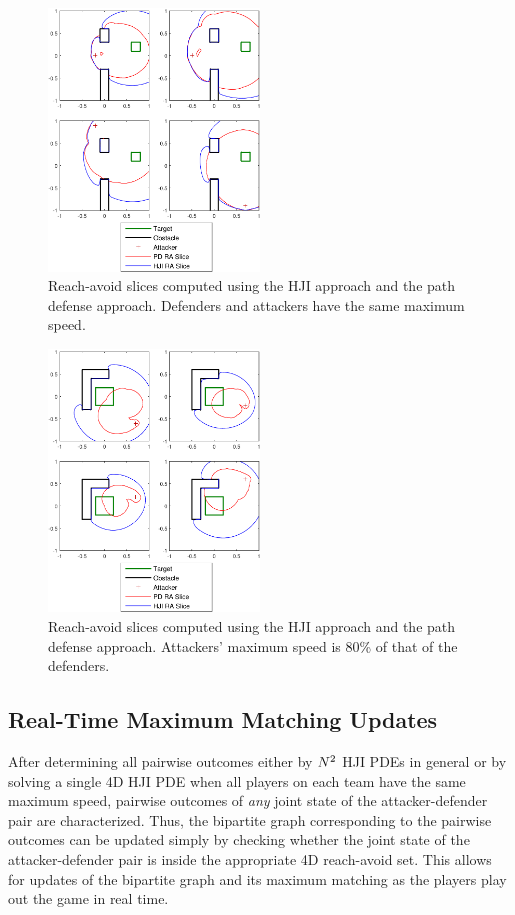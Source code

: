 \begin{figure}
	\centering
	\includegraphics[width=0.5\textwidth]{"fig/OLGame_compare"}
	\caption{Reach-avoid slices computed using the HJI approach and the path defense approach. Defenders and attackers have the same maximum speed.}
	\label{fig:comp_ol}
\end{figure}

\begin{figure}
	\centering
	\includegraphics[width=0.5\textwidth]{"fig/midLGame_compare"}
	\caption{Reach-avoid slices computed using the HJI approach and the path defense approach. Attackers' maximum speed is 80\% of that of the defenders.}
	\label{fig:comp_ml}
\end{figure}

\subsection{Real-Time Maximum Matching Updates}
After determining all pairwise outcomes either by $N^2$ HJI PDEs in general or by solving a single 4D HJI PDE when all players on each team have the same maximum speed, pairwise outcomes of \textit{any} joint state of the attacker-defender pair are characterized. Thus, the bipartite graph corresponding to the pairwise outcomes can be updated simply by checking whether the joint state of the attacker-defender pair is inside the appropriate 4D reach-avoid set. This allows for updates of the bipartite graph and its maximum matching as the players play out the game in real time.

